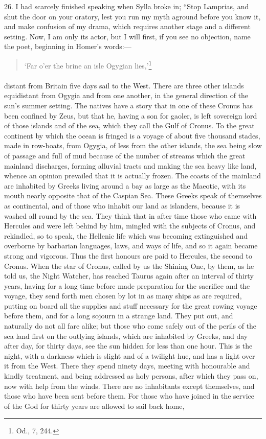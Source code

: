 \documentclass[a4paper, 11pt, oneside, polutonikogreek, english]{article}
\begin{document}
26. I had scarcely finished speaking when Sylla broke in; ``Stop Lamprias, and shut the door on your oratory, lest you run my myth aground before you know it, and make confusion of my drama, which requires another stage and a different setting. Now, I am only its actor, but I will first, if you see no objection, name the poet, beginning in Homer's words:---
\begin{quotation}
`Far o'er the brine an isle Ogygian lies,'\footnote{Od., 7, 244.}
\end{quotation}
\paragraph{}
distant from Britain five days sail to the West. There are three other islands equidistant from Ogygia and from one another, in the general direction of the sun's summer setting. The natives have a story that in one of these Cronus has been confined by Zeus, but that he, having a son for gaoler, is left sovereign lord of those islands and of the sea, which they call the Gulf of Cronus. To the great continent by which the ocean is fringed is a voyage of about five thousand stades, made in row-boats, from Ogygia, of less from the other islands, the sea being slow of passage and full of mud because of the number of streams which the great mainland discharges, forming alluvial tracts and making the sea heavy like land, whence an opinion prevailed that it is actually frozen. The coasts of the mainland are inhabited by Greeks living around a bay as large as the Maeotic, with its mouth nearly opposite that of the Caspian Sea. These Greeks speak of themselves as continental, and of those who inhabit our land as islanders, because it is washed all round by the sea. They think that in after time those who came with Hercules and were left behind by him, mingled with the subjects of Cronus, and rekindled, so to speak, the Hellenic life which was becoming extinguished and overborne by barbarian languages, laws, and ways of life, and so it again became strong and vigorous. Thus the first honours are paid to Hercules, the second to Cronus. When the star of Cronus, called by us the Shining One, by them, as he told us, the Night Watcher, has reached Taurus again after an interval of thirty years, having for a long time before made preparation for the sacrifice and the voyage, they send forth men chosen by lot in as many ships as are required, putting on board all the supplies and stuff necessary for the great rowing voyage before them, and for a long sojourn in a strange land. They put out, and naturally do not all fare alike; but those who come safely out of the perils of the sea land first on the outlying islands, which are inhabited by Greeks, and day after day, for thirty days, see the sun hidden for less than one hour. This is the night, with a darkness which is slight and of a twilight hue, and has a light over it from the West. There they spend ninety days, meeting with honourable and kindly treatment, and being addressed as holy persons, after which they pass on, now with help from the winds. There are no inhabitants except themselves, and those who have been sent before them. For those who have joined in the service of the God for thirty years are allowed to sail back home, 
\end{document}
